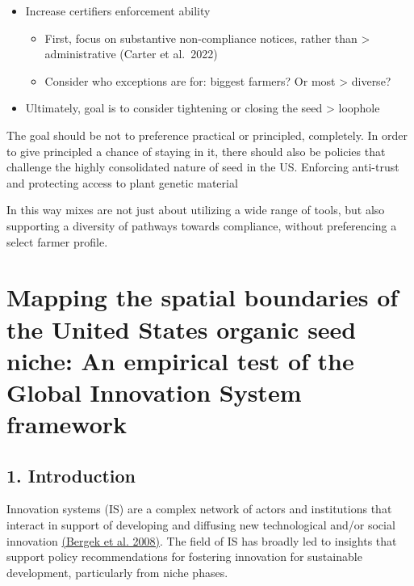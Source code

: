 \documentclass[twoside,12pt,final]{ucthesis-CA2012}
\begin{document}
\begin{ucmainmatter}
\begin{itemize}
\begin{itemize}
  \end{itemize}
\item
  Increase certifiers enforcement ability
  \begin{itemize}
  \item
    First, focus on substantive non-compliance notices, rather than
    \textgreater{} administrative (Carter et al.~2022)
  \item
    Consider who exceptions are for: biggest farmers? Or most
    \textgreater{} diverse?
  \end{itemize}
\item
  Ultimately, goal is to consider tightening or closing the seed
  \textgreater{} loophole
\end{itemize}
The goal should be not to preference practical or principled,
completely. In order to give principled a chance of staying in it, there
should also be policies that challenge the highly consolidated nature of
seed in the US. Enforcing anti-trust and protecting access to plant
genetic material

In this way mixes are not just about utilizing a wide range of tools,
but also supporting a diversity of pathways towards compliance, without
preferencing a select farmer profile.

\hypertarget{mapping-the-spatial-boundaries-of-the-united-states-organic-seed-niche-an-empirical-test-of-the-global-innovation-system-framework}{%
\chapter{Mapping the spatial boundaries of the United State\textquotesingle s organic seed niche: An empirical test of the Global Innovation System framework}\label{mapping-the-spatial-boundaries-of-the-united-states-organic-seed-niche-an-empirical-test-of-the-global-innovation-system-framework}}


\hypertarget{introduction-2}{%
\section{1. Introduction}\label{introduction-2}}

Innovation systems (IS) are a complex network of actors and institutions
that interact in support of developing and diffusing new technological
and/or social innovation \href{https://www.zotero.org/google-docs/?CqKd0Z}{(Bergek et al.
2008)}. The field of IS has
broadly led to insights that support policy recommendations for
fostering innovation for sustainable development, particularly from
\textquotesingle niche\textquotesingle{} phases.


\end{ucmainmatter}
\end{document}
